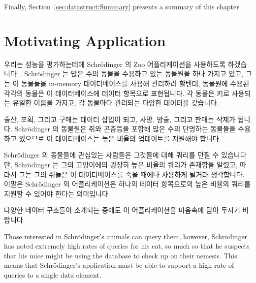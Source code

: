 Finally, Section~\ref{sec:datastruct:Summary}
presents a summary of this chapter.
\fi

\section{Motivating Application}
\label{sec:datastruct:Motivating Application}

우리는 성능을 평가하는데에 Schr\"odinger 의 Zoo 어플리케이션을 사용하도록
하겠습니다~\cite{McKenney:2013:SDS:2483852.2483867}.
Schr\"odinger 는 많은 수의 동물을 수용하고 있는 동물원을 하나 가지고 있고, 그는
이 동물들을 in-memory 데이터베이스를 사용해 관리하려 할텐데, 동물원에 수용된
각각의 동물은 이 데이터베이스에 데이터 항목으로 표현됩니다.
각 동물은 키로 사용되는 유일한 이름을 가지고, 각 동물마다 관리되는 다양한
데이터를 갖습니다.

출산, 포획, 그리고 구매는 데이터 삽입이 되고, 사망, 방출, 그리고 판매는 삭제가
됩니다.
Schr\"odinger 의 동물원은 쥐와 곤충등을 포함해 많은 수의 단명하는 동물들을
수용하고 있으므로 이 데이터베이스는 높은 비율의 업데이트를 지원해야 합니다.

Schr\"odinger 의 동물들에 관심있는 사람들은 그것들에 대해 쿼리를 던질 수
있습니다만, Schr\"odinger 는 그의 고양이에의 굉장히 높은 비율의 쿼리가 존재함을
알렸고, 따라서 그는 그의 쥐들은 이 데이터베이스를 죽을 때에나 사용하게 될거라
생각합니다.
이말은 Schr\"odinger 의 어플리케이션은 하나의 데이터 항목으로의 높은 비율의
쿼리를 지원할 수 있어야 한다는 의미입니다.

다양한 데이터 구조들이 소개되는 중에도 이 어플리케이션을 마음속에 담아 두시기
바랍니다.
\iffalse

Those interested in Schr\"odinger's animals can query them, however,
Schr\"odinger has noted extremely high rates of queries for his cat,
so much so that he suspects that his mice might be using the database
to check up on their nemesis.
This means that Schr\"odinger's application must be able to support a
high rate of queries to a single data element.

